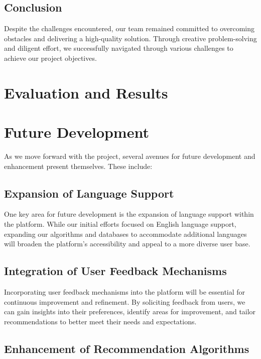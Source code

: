 \documentclass{article}
\begin{document}
\subsection{Conclusion}

Despite the challenges encountered, our team remained committed to overcoming obstacles and delivering a high-quality solution. Through creative problem-solving and diligent effort, we successfully navigated through various challenges to achieve our project objectives.


\section{Evaluation and Results}

\section{Future Development}

As we move forward with the project, several avenues for future development and enhancement present themselves. These include:

\subsection{Expansion of Language Support}

One key area for future development is the expansion of language support within the platform. While our initial efforts focused on English language support, expanding our algorithms and databases to accommodate additional languages will broaden the platform's accessibility and appeal to a more diverse user base.

\subsection{Integration of User Feedback Mechanisms}

Incorporating user feedback mechanisms into the platform will be essential for continuous improvement and refinement. By soliciting feedback from users, we can gain insights into their preferences, identify areas for improvement, and tailor recommendations to better meet their needs and expectations.

\subsection{Enhancement of Recommendation Algorithms}
\end{document}
